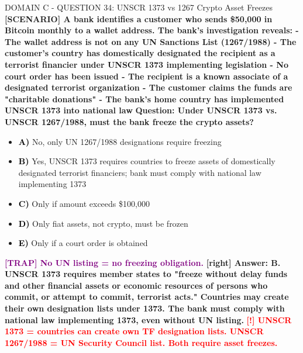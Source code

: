 \documentclass[11pt,a4paper]{beamer}
\newcommand{\redflag}[1]{\textcolor{red}{\textbf{[!] #1}}}
\newcommand{\trap}[1]{\textcolor{purple}{\textbf{[TRAP] #1}}}
\newcommand{\correct}[1]{\textcolor{green!50!black}{\textbf{[right] #1}}}
\newcommand{\scenario}[1]{\textcolor{blue!70!black}{\textbf{[SCENARIO] #1}}}
\newcommand{\option}[1]{\textcolor{black}{\textbf{#1}}}
\begin{document}
\begin{frame}{DOMAIN C - QUESTION 34: UNSCR 1373 vs 1267 Crypto Asset Freezes}
\scenario{A bank identifies a customer who sends \$50,000 in Bitcoin monthly to a wallet address. The bank's investigation reveals:
- The wallet address is not on any UN Sanctions List (1267/1988)
- The customer's country has domestically designated the recipient as a terrorist financier under UNSCR 1373 implementing legislation
- No court order has been issued
- The recipient is a known associate of a designated terrorist organization
- The customer claims the funds are "charitable donations"
- The bank's home country has implemented UNSCR 1373 into national law}
\vspace{0.2cm}
\textbf{Question: Under UNSCR 1373 vs. UNSCR 1267/1988, must the bank freeze the crypto assets?}
\vspace{0.1cm}
\begin{itemize}
    \item \option{A)} No, only UN 1267/1988 designations require freezing
    \item \option{B)} Yes, UNSCR 1373 requires countries to freeze assets of domestically designated terrorist financiers; bank must comply with national law implementing 1373
    \item \option{C)} Only if amount exceeds \$100,000
    \item \option{D)} Only fiat assets, not crypto, must be frozen
    \item \option{E)} Only if a court order is obtained
\end{itemize}
\vspace{0.2cm}
\trap{No UN listing = no freezing obligation.}
\correct{Answer: B. UNSCR 1373 requires member states to "freeze without delay funds and other financial assets or economic resources of persons who commit, or attempt to commit, terrorist acts." Countries may create their own designation lists under 1373. The bank must comply with national law implementing 1373, even without UN listing.}
\redflag{UNSCR 1373 = countries can create own TF designation lists. UNSCR 1267/1988 = UN Security Council list. Both require asset freezes.}
\end{frame}
\end{document}
